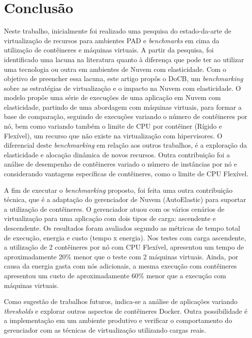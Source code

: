 \documentclass[twoside,english,brazilian]{UNISINOSartigo}
\begin{document}
\section{Conclusão}
\label{conclusion}

Neste trabalho, inicialmente foi realizado uma pesquisa do estado-da-arte de virtualização de recursos para ambientes PAD e \textit{benchmarks} em cima da utilização de contêineres e máquinas virtuais. A partir da pesquisa, foi identificado uma lacuna na literatura quanto à diferença que pode ter ao utilizar uma tecnologia ou outra em ambientes de Nuvem com elasticidade. Com o objetivo de preencher essa lacuna, este artigo propôs o DoCB, um \textit{benchmarking} sobre as estratégias de virtualização e o impacto na Nuvem com elasticidade. O modelo propôe uma série de execuções de uma aplicação em Nuvem com elasticidade, partindo de uma abordagem com máquinas virtuais, para formar a base de comparação, seguindo de execuções variando o número de contêineres por nó, bem como variando também o limite de CPU por contêiner (Rígido e Flexível), um recurso que não existe na virtualização com hipervisores. O diferencial deste \textit{benchmarking} em relação aos outros trabalhos, é a exploração da elasticidade e alocação dinâmica de novos recursos. Outra contribuição foi a análise de desempenho de contêineres variado o número de instâncias por nó e considerando vantagens específicas de contêineres, como o limite de CPU Flexível. 

A fim de executar o \textit{benchmarking} proposto, foi feita uma outra contribuição técnica, que é a adaptação do gerenciador de Nuvem (AutoElastic) para suportar a utilização de contêineres. O gerenciador atuou com os vários cenários de virtualização para uma aplicação com dois tipos de carga: ascendente e descendente. Os resultados foram avaliados segundo as métricas de tempo total de execução, energia e custo (tempo x energia). Nos testes com carga ascendente, a utilização de 2 contêineres por nó com CPU Flexível, apresentou um tempo de aproximadamente 20\% menor que o teste com 2 máquinas virtuais. Ainda, por causa da energia gasta com nós adicionais, a mesma execução com contêineres apresentou um custo de aproximadamente 60\% menor que a execução com máquinas virtuais. 

Como sugestão de trabalhos futuros, indica-se a análise de aplicações variando \textit{thresholds} e explorar outros aspectos de contêineres Docker. Outra possibilidade é a implementação em um ambiente produtivo e verificar o comportamento do gerenciador com as técnicas de virtualização utilizando cargas reais. 
\end{document}
